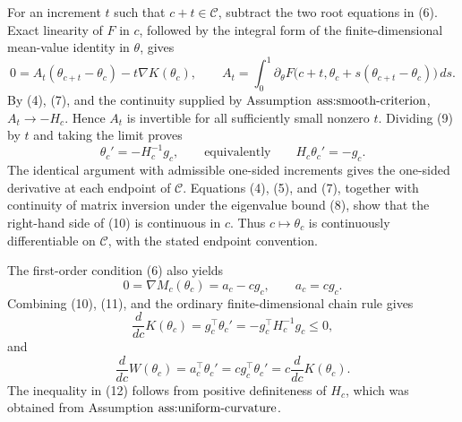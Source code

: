 For an increment \(t\) such that \(c+t\in\mathcal C\), subtract the two root equations in (6).  Exact linearity of \(F\) in \(c\), followed by the integral form of the finite-dimensional mean-value identity in \(\theta\), gives
\[
 0=A_t(\theta_{c+t}-\theta_c)-t\nabla K(\theta_c),
 \qquad
 A_t=\int_0^1\partial_\theta F\bigl(c+t,
       \theta_c+s(\theta_{c+t}-\theta_c)\bigr)\,ds.             \tag{9}
\]
By (4), (7), and the continuity supplied by Assumption \(\textnormal{ass:smooth-criterion}\), \(A_t\to-H_c\).  Hence \(A_t\) is invertible for all sufficiently small nonzero \(t\).  Dividing (9) by \(t\) and taking the limit proves
\[
 \theta_c'=-H_c^{-1}g_c,
 \qquad\text{equivalently}\qquad H_c\theta_c'=-g_c.            \tag{10}
\]
The identical argument with admissible one-sided increments gives the one-sided derivative at each endpoint of \(\mathcal C\).  Equations (4), (5), and (7), together with continuity of matrix inversion under the eigenvalue bound (8), show that the right-hand side of (10) is continuous in \(c\).  Thus \(c\mapsto\theta_c\) is continuously differentiable on \(\mathcal C\), with the stated endpoint convention.

The first-order condition (6) also yields
\[
 0=\nabla M_c(\theta_c)=a_c-cg_c,
 \qquad a_c=cg_c.                                               \tag{11}
\]
Combining (10), (11), and the ordinary finite-dimensional chain rule gives
\[
 \frac{d}{dc}K(\theta_c)
 =g_c^\top\theta_c'
 =-g_c^\top H_c^{-1}g_c\leq0,                                  \tag{12}
\]
and
\[
 \frac{d}{dc}W(\theta_c)
 =a_c^\top\theta_c'
 =c g_c^\top\theta_c'
 =c\frac{d}{dc}K(\theta_c).                                    \tag{13}
\]
The inequality in (12) follows from positive definiteness of \(H_c\), which was obtained from Assumption \(\textnormal{ass:uniform-curvature}\).

